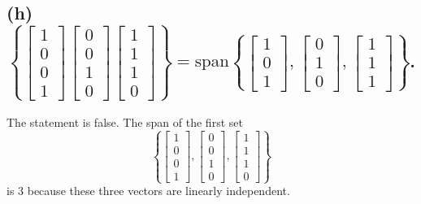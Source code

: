 \documentclass{article}
\begin{document}
\subsection*{(h) \(\left\{ 
    \begin{bmatrix} 
    1 \\ 0 \\ 0 \\ 1
    \end{bmatrix}
    \begin{bmatrix}
    0 \\ 0 \\ 1 \\ 0
    \end{bmatrix}
    \begin{bmatrix}
    1 \\ 1 \\ 1 \\ 0 
    \end{bmatrix}
    \right\} 
    = \text{span}\left\{ 
    \begin{bmatrix} 
    1 \\ 0 \\ 1 
    \end{bmatrix}, 
    \begin{bmatrix} 
    0 \\ 1 \\ 0 
    \end{bmatrix}, 
    \begin{bmatrix} 
    1 \\ 1 \\ 1 
    \end{bmatrix}
    \right\}\).
}

The statement is false. The span of the first set 
\[
\left\{ 
\begin{bmatrix} 
1 \\ 0 \\ 0 \\ 1 
\end{bmatrix}, 
\begin{bmatrix} 
0 \\ 0 \\ 1 \\ 0 
\end{bmatrix}, 
\begin{bmatrix} 
1 \\ 1 \\ 1 \\ 0 
\end{bmatrix}
\right\}
\]
is 3 because these three vectors are linearly independent.
\end{document}
